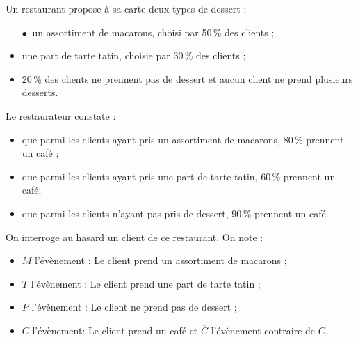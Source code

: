 \documentclass[a4paper,11pt]{article}
\begin{document}
Un restaurant propose à sa carte deux types de dessert :
%
\begin{itemize}
	\item[$\bullet~$] un assortiment de macarons, choisi par 50\,\% des clients ;
	\item une part de tarte tatin, choisie par 30\,\% des clients ;
	\item 20\,\% des clients ne prennent pas de dessert et aucun client ne prend plusieurs desserts.
\end{itemize}
%
 Le restaurateur constate :
%
\begin{itemize}
	\item que parmi les clients ayant pris un assortiment de macarons, 80\,\% prennent un café ; 
	\item que parmi les clients ayant pris une part de tarte tatin, 60\,\% prennent un café; 
	\item que parmi les clients n'ayant pas pris de dessert, 90\,\% prennent un café.
\end{itemize}
%
On interroge au hasard un client de ce restaurant. On note :
%
\begin{itemize}
	\item $M$ l'évènement : \og Le client prend un assortiment de macarons \fg{} ; 
	\item $T$ l'évènement : \og Le client prend une part de tarte tatin \fg{} ; 
	\item $P$ l'évènement : \og Le client ne prend pas de dessert \fg{} ; 
	\item $C$ l'évènement: \og Le client prend un café \fg{} et $\overline{C}$ l'évènement contraire de $C$.
\end{itemize}
%
\end{document}
